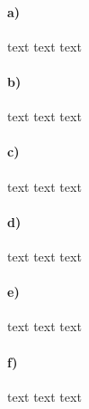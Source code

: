 \paragraph{a)}
text text text

\paragraph{b)}
text text text

\paragraph{c)}
text text text

\paragraph{d)}
text text text

\paragraph{e)}
text text text

\paragraph{f)}
text text text
